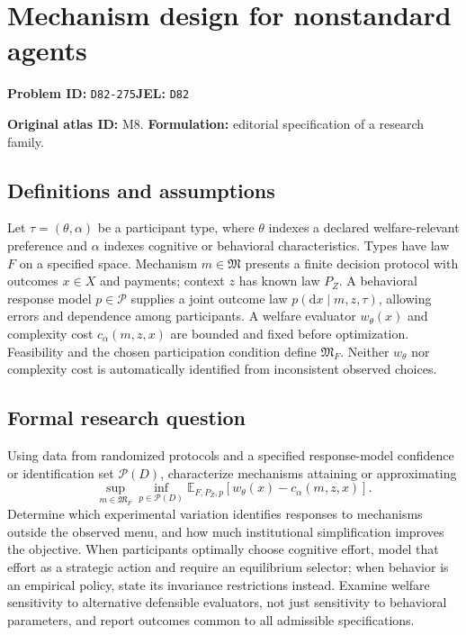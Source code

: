 \documentclass[11pt,a4paper]{article}
\begin{document}
\section*{Mechanism design for nonstandard agents}
\textbf{Problem ID:} \texttt{D82-275}\quad \textbf{JEL:} \texttt{D82}\par
\label{problem:OP-0008}
\label{atlas:prob:M8}

\noindent\textbf{Original atlas ID:} M8. \textbf{Formulation:} editorial specification of a research family.

\subsection*{Definitions and assumptions}

Let $\tau=(\theta,\alpha)$ be a participant type, where $\theta$ indexes a declared welfare-relevant preference and $\alpha$ indexes cognitive or behavioral characteristics. Types have law $F$ on a specified space. Mechanism $m\in\mathfrak M$ presents a finite decision protocol with outcomes $x\in X$ and payments; context $z$ has known law $P_Z$. A behavioral response model $p\in\mathcal P$ supplies a joint outcome law $p(\mathrm dx\mid m,z,\tau)$, allowing errors and dependence among participants. A welfare evaluator $w_\theta(x)$ and complexity cost $c_\alpha(m,z,x)$ are bounded and fixed before optimization. Feasibility and the chosen participation condition define $\mathfrak M_F$. Neither $w_\theta$ nor complexity cost is automatically identified from inconsistent observed choices.

\subsection*{Formal research question}

Using data from randomized protocols and a specified response-model confidence or identification set $\mathcal P(D)$, characterize mechanisms attaining or approximating
\[
\sup_{m\in\mathfrak M_F}\inf_{p\in\mathcal P(D)}
 \mathbb E_{F,P_Z,p}\!\left[w_\theta(x)-c_\alpha(m,z,x)\right].
\]
Determine which experimental variation identifies responses to mechanisms outside the observed menu, and how much institutional simplification improves the objective. When participants optimally choose cognitive effort, model that effort as a strategic action and require an equilibrium selector; when behavior is an empirical policy, state its invariance restrictions instead. Examine welfare sensitivity to alternative defensible evaluators, not just sensitivity to behavioral parameters, and report outcomes common to all admissible specifications.
\end{document}
